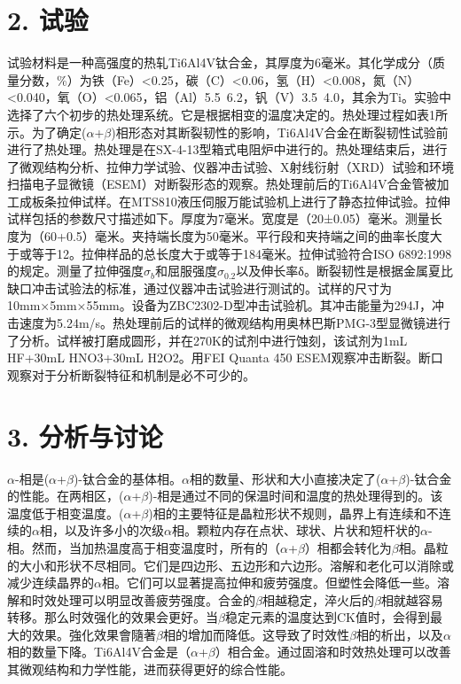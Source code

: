\section*{2. 试验}
试验材料是一种高强度的热轧Ti6Al4V钛合金，其厚度为6毫米。其化学成分（质量分数，\%）为铁（Fe）<0.25，碳（C）<0.06，氢（H）<0.008，氮（N）<0.040，氧（O）<0.065，铝（Al）5.5~6.2，钒（V）3.5~4.0，其余为Ti。实验中选择了六个初步的热处理系统。它是根据相变的温度决定的。热处理过程如表1所示。为了确定($\alpha$+$\beta$)相形态对其断裂韧性的影响，Ti6Al4V合金在断裂韧性试验前进行了热处理。热处理是在SX-4-13型箱式电阻炉中进行的。热处理结束后，进行了微观结构分析、拉伸力学试验、仪器冲击试验、X射线衍射（XRD）试验和环境扫描电子显微镜（ESEM）对断裂形态的观察。热处理前后的Ti6Al4V合金管被加工成板条拉伸试样。在MTS810液压伺服万能试验机上进行了静态拉伸试验。拉伸试样包括的参数尺寸描述如下。厚度为7毫米。宽度是（20±0.05）毫米。测量长度为（60+0.5）毫米。夹持端长度为50毫米。平行段和夹持端之间的曲率长度大于或等于12。拉伸样品的总长度大于或等于184毫米。拉伸试验符合ISO 6892:1998的规定。测量了拉伸强度$\sigma_b$和屈服强度$\sigma_{0.2}$以及伸长率δ。断裂韧性是根据金属夏比缺口冲击试验法的标准，通过仪器冲击试验进行测试的。试样的尺寸为10mm×5mm×55mm。设备为ZBC2302-D型冲击试验机。其冲击能量为294J，冲击速度为5.24m/s。热处理前后的试样的微观结构用奥林巴斯PMG-3型显微镜进行了分析。试样被打磨成圆形，并在270K的试剂中进行蚀刻，该试剂为1mL HF+30mL HNO3+30mL H2O2。用FEI Quanta 450 ESEM观察冲击断裂。断口观察对于分析断裂特征和机制是必不可少的。
\section*{3. 分析与讨论}
$\alpha$-相是($\alpha$+$\beta$)-钛合金的基体相。$\alpha$相的数量、形状和大小直接决定了($\alpha$+$\beta$)-钛合金的性能。在两相区，($\alpha$+$\beta$)-相是通过不同的保温时间和温度的热处理得到的。该温度低于相变温度。($\alpha$+$\beta$)相的主要特征是晶粒形状不规则，晶界上有连续和不连续的$\alpha$相，以及许多小的次级$\alpha$相。颗粒内存在点状、球状、片状和短杆状的$\alpha$-相。然而，当加热温度高于相变温度时，所有的（$\alpha$+$\beta$）相都会转化为$\beta$相。晶粒的大小和形状不尽相同。它们是四边形、五边形和六边形。溶解和老化可以消除或减少连续晶界的$\alpha$相。它们可以显著提高拉伸和疲劳强度。但塑性会降低一些。溶解和时效处理可以明显改善疲劳强度。合金的$\beta$相越稳定，淬火后的$\beta$相就越容易转移。那么时效强化的效果会更好。当$\beta$稳定元素的温度达到CK值时，会得到最大的效果。強化效果會隨著$\beta$相的增加而降低。这导致了时效性$\beta$相的析出，以及$\alpha$相的数量下降。Ti6Al4V合金是（$\alpha$+$\beta$）相合金。通过固溶和时效热处理可以改善其微观结构和力学性能，进而获得更好的综合性能。

